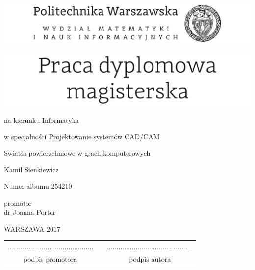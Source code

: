\documentclass[12pt,twoside,a4paper]{article}
\newcommand{\discipline}{Informatyka}
\newcommand{\spec}{Projektowanie systemów CAD/CAM}
\renewcommand{\title}{Światła powierzchniowe w grach komputerowych}
\renewcommand{\author}{Kamil Sienkiewicz}
\newcommand{\supervisor}{dr Joanna Porter}
\newcommand{\album}{254210}
\renewcommand{\year}{2017}
\begin{document}
\pagestyle{empty}

\begin{center}
\includegraphics[scale=1.]{politechnika}
\vspace{70pt}


\includegraphics[scale=1.]{praca_mgr} %

{ \arial na kierunku \discipline

\arial w specjalności \spec

\vspace{40pt}
{\arial \large \title}

\vspace{50pt}

{\arial \huge \author}

\vspace{5pt}

Numer albumu \album

\vspace{40pt}

promotor \\
{\arial \supervisor}



 \vfill
WARSZAWA \year \\
}
\end{center}


\newpage
\null

\vfill

\begin{center}
\begin{tabular}[t]{ccc}
............................................. & \hspace*{100pt} & .............................................\\
podpis promotora & \hspace*{100pt} & podpis autora
\end{tabular}
\end{center}
\end{document}
